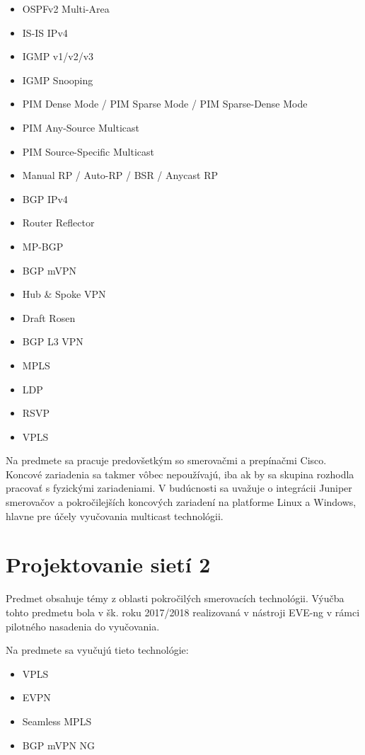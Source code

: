 \begin{itemize}
    \item OSPFv2 Multi-Area
    \item IS-IS IPv4 
    \item IGMP v1/v2/v3
    \item IGMP Snooping
    \item PIM Dense Mode / PIM Sparse Mode / PIM Sparse-Dense Mode
    \item PIM Any-Source Multicast
    \item PIM Source-Specific Multicast
    \item Manual RP / Auto-RP / BSR / Anycast RP
    \item BGP IPv4
    \item Router Reflector
    \item MP-BGP
    \item BGP mVPN
    \item Hub \& Spoke VPN
    \item Draft Rosen
    \item BGP L3 VPN
    \item MPLS
    \item LDP
    \item RSVP
    \item VPLS
\end{itemize}

Na predmete sa pracuje predovšetkým so smerovačmi a prepínačmi Cisco. Koncové zariadenia sa takmer vôbec nepoužívajú, iba ak by sa skupina rozhodla pracovať s fyzickými zariadeniami. V budúcnosti sa uvažuje o integrácii Juniper smerovačov a pokročilejších koncových zariadení na platforme Linux a Windows, hlavne pre účely vyučovania multicast technológii.



\section{Projektovanie sietí 2}

Predmet obsahuje témy z oblasti pokročilých smerovacích technológii. Výučba tohto predmetu bola v šk. roku 2017/2018 realizovaná v nástroji EVE-ng v rámci pilotného nasadenia do vyučovania.

Na predmete sa vyučujú tieto technológie:

\begin{itemize}
    \item VPLS
    \item EVPN
    \item Seamless MPLS
    \item BGP mVPN NG
\end{itemize}

